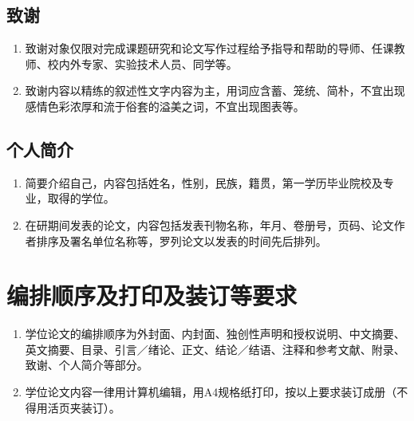 \subsection{致谢}

\begin{enumerate}[label=\arabic*)]
	\item 致谢对象仅限对完成课题研究和论文写作过程给予指导和帮助的导师、任课教师、校内外专家、实验技术人员、同学等。
	
	\item 致谢内容以精练的叙述性文字内容为主，用词应含蓄、笼统、简朴，不宜出现感情色彩浓厚和流于俗套的溢美之词，不宜出现图表等。
	
\end{enumerate}

\subsection{个人简介}

\begin{enumerate}[label=\arabic*)]
	\item 简要介绍自己，内容包括姓名，性别，民族，籍贯，第一学历毕业院校及专业，取得的学位。
	
	\item 在研期间发表的论文，内容包括发表刊物名称，年月、卷册号，页码、论文作者排序及署名单位名称等，罗列论文以发表的时间先后排列。
	
\end{enumerate}


\section{编排顺序及打印及装订等要求}

\begin{enumerate}[label=\arabic*)]
	\item 学位论文的编排顺序为外封面、内封面、独创性声明和授权说明、中文摘要、英文摘要、目录、引言／绪论、正文、结论／结语、注释和参考文献、附录、致谢、个人简介等部分。
	
	\item 学位论文内容一律用计算机编辑，用A4规格纸打印，按以上要求装订成册（不得用活页夹装订）。
\end{enumerate}

